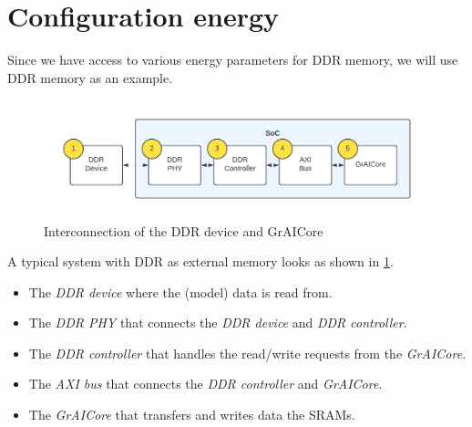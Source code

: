 \section{Configuration energy}
Since we have access to various energy parameters for DDR memory, we will use DDR memory as an example.

\begin{figure}[hbtp]
    \centering
    \includegraphics[width=0.8\linewidth]{assets/ddr_graicore_block_diagram.pdf}
    \caption{
        Interconnection of the DDR device and GrAICore
    }
    \label{fig:ddr_graicore_block_diagram}
\end{figure}

A typical system with DDR as external memory looks as shown in \cref{fig:ddr_graicore_block_diagram}.
\begin{itemize}
    \item The \textit{DDR device} where the (model) data is read from.
    \item The \textit{DDR PHY} that connects the \textit{DDR device} and \textit{DDR controller}.
    \item The \textit{DDR controller} that handles the read/write requests from the \textit{GrAICore}.
    \item The \textit{AXI bus} that connects the \textit{DDR controller} and \textit{GrAICore}.
    \item The \textit{GrAICore} that transfers and writes data the SRAMs.
\end{itemize}



